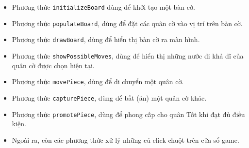 \begin{itemize}
 \item Phương thức \lstinline{initializeBoard} dùng để khởi tạo một bàn cờ.
 \item Phương thức \lstinline{populateBoard}, dùng để đặt các quân cờ vào vị trí trên bàn cờ.
  \item Phương thức \lstinline{drawBoard}, dùng để hiển thị bàn cờ ra màn hình.
  \item Phương thức \lstinline{showPossibleMoves}, dùng để hiển thị những nước đi khả dĩ của quân cờ được chọn hiện tại.
  \item Phương thức \lstinline{movePiece}, dùng để di chuyển một quân cờ.
  \item Phương thức \lstinline{capturePiece}, dùng để bắt (ăn) một quân cờ khác.
  \item Phương thức \lstinline{promotePiece}, dùng để phong cấp cho quân Tốt khi đạt đủ điều kiện.
  \item Ngoài ra, còn các phương thức xử lý những cú click chuột trên cửa sổ game.
\end{itemize} 
